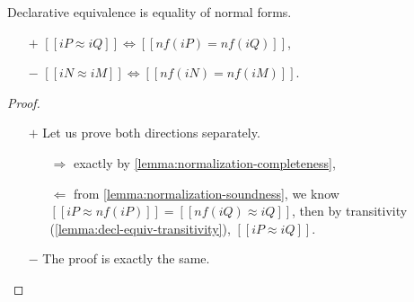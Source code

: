 \begin{lemma}
  \label{lemma:decl-equiv-algorithmization}
  Declarative equivalence is equality of normal forms. 
  \begin{itemize}
    \item[$+$] $[[iP ≈ iQ]] \iff [[nf(iP) = nf(iQ)]]$,
    \item[$-$] $[[iN ≈ iM]] \iff [[nf(iN) = nf(iM)]]$.
  \end{itemize}
\end{lemma}
\begin{proof} \hfill
  \begin{itemize}
    \item[$+$] Let us prove both directions separately.
    \begin{itemize}
      \item[$\Rightarrow$] 
        exactly by \cref{lemma:normalization-completeness},
      \item[$\Leftarrow$] 
        from \cref{lemma:normalization-soundness}, we know
        $[[iP ≈ nf(iP)]] = [[nf(iQ) ≈ iQ]]$, then by transitivity (\cref{lemma:decl-equiv-transitivity}),
        $[[iP ≈ iQ]]$.
    \end{itemize}
    \item[$-$] The proof is exactly the same.
  \end{itemize}
\end{proof}

